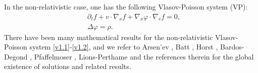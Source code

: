 \documentclass[11pt,reqno]{amsart}%
\theoremstyle{definition}
\theoremstyle{remark}
\begin{document}
In the non-relativistic case, one has the following Vlasov-Poisson system (VP):
\begin{align}
&\partial_t f+v\cdot\nabla_{x}f+\nabla_{x}\varphi\cdot\nabla_{v}f=0,\label{v1.1}\\
&\Delta\varphi=\rho.\label{v1.2}
\end{align}
There have been many mathematical results for the non-relativistic Vlasov-Poisson system \eqref{v1.1}-\eqref{v1.2}, and we refer to Arsen'ev \cite{A}, Batt \cite{B}, Horst \cite{H}, Bardos-Degond \cite{BD}, Pfaffelmoser \cite{P}, Lions-Perthame \cite{LP} and the references therein for the global existence of solutions and related results.
%
%
\end{document}
